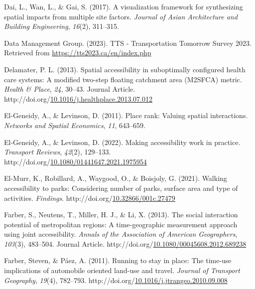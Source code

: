 \documentclass[
11pt, %
oneside, %
english, %
singlespacing, %
]{macthesis} %
\newlength{\cslhangindent}
\newenvironment{CSLReferences}[2] %
{\begin{list}{}{%
	\setlength{\itemindent}{0pt}
	\setlength{\leftmargin}{0pt}
	\setlength{\parsep}{0pt}
	\ifodd #1
	\setlength{\leftmargin}{\cslhangindent}
	\setlength{\itemindent}{-1\cslhangindent}
	\fi
	\setlength{\itemsep}{#2\baselineskip}}}
{\end{list}}
\begin{document}
\begin{CSLReferences}{1}{0}
Dai, L., Wan, L., \& Gai, S. (2017). A visualization framework for synthesizing spatial impacts from multiple site factors. \emph{Journal of Asian Architecture and Building Engineering}, \emph{16}(2), 311--315.

Data Management Group. (2023). {TTS} - {Transportation} {Tomorrow} {Survey} 2023. Retrieved from \url{https://tts2023.ca/en/index.php}

Delamater, P. L. (2013). Spatial accessibility in suboptimally configured health care systems: A modified two-step floating catchment area (M2SFCA) metric. \emph{Health \& Place}, \emph{24}, 30--43. Journal Article. http://doi.org/\href{https://doi.org/10.1016/j.healthplace.2013.07.012}{10.1016/j.healthplace.2013.07.012}

El-Geneidy, A., \& Levinson, D. (2011). Place rank: Valuing spatial interactions. \emph{Networks and Spatial Economics}, \emph{11}, 643--659.

El-Geneidy, A., \& Levinson, D. (2022). Making accessibility work in practice. \emph{Transport Reviews}, \emph{42}(2), 129--133. http://doi.org/\href{https://doi.org/10.1080/01441647.2021.1975954}{10.1080/01441647.2021.1975954}

El-Murr, K., Robillard, A., Waygood, O., \& Boisjoly, G. (2021). Walking accessibility to parks: Considering number of parks, surface area and type of activities. \emph{Findings}. http://doi.org/\href{https://doi.org/10.32866/001c.27479}{10.32866/001c.27479}

Farber, S., Neutens, T., Miller, H. J., \& Li, X. (2013). The social interaction potential of metropolitan regions: A time-geographic measurement approach using joint accessibility. \emph{Annals of the Association of American Geographers}, \emph{103}(3), 483--504. Journal Article. http://doi.org/\href{https://doi.org/10.1080/00045608.2012.689238}{10.1080/00045608.2012.689238}

Farber, Steven, \& Páez, A. (2011). Running to stay in place: The time-use implications of automobile oriented land-use and travel. \emph{Journal of Transport Geography}, \emph{19}(4), 782--793. http://doi.org/\href{https://doi.org/10.1016/j.jtrangeo.2010.09.008}{10.1016/j.jtrangeo.2010.09.008}


\end{CSLReferences}
\end{document}
